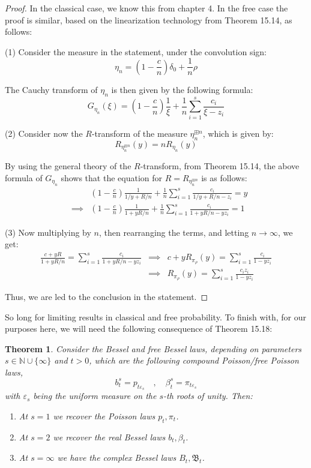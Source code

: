 \documentclass[12pt]{amsbook}
\newtheorem{theorem}{Theorem}[chapter]
\begin{document}
\begin{proof}
In the classical case, we know this from chapter 4. In the free case the proof is similar, based on the linearization technology from Theorem 15.14, as follows:

\medskip

(1) Consider the measure in the statement, under the convolution sign:
$$\eta_n=\left(1-\frac{c}{n}\right)\delta_0+\frac{1}{n}\rho$$

The Cauchy transform of $\eta_n$ is then given by the following formula:
$$G_{\eta_n}(\xi)=\left(1-\frac{c}{n}\right)\frac{1}{\xi}+\frac{1}{n}\sum_{i=1}^s\frac{c_i}{\xi-z_i}$$

(2) Consider now the $R$-transform of the measure $\eta_n^{\boxplus n}$, which is given by:
$$R_{\eta_n^{\boxplus n}}(y)=nR_{\eta_n}(y)$$

By using the general theory of the $R$-transform, from Theorem 15.14, the above formula of $G_{\eta_n}$ shows that the equation for $R=R_{\eta_n^{\boxplus n}}$ is as follows:
\begin{eqnarray*}
&&\left(1-\frac{c}{n}\right)\frac{1}{1/y+R/n}+\frac{1}{n}\sum_{i=1}^s\frac{c_i}{1/y+R/n-z_i}=y\\
&\implies&\left(1-\frac{c}{n}\right)\frac{1}{1+yR/n}+\frac{1}{n}\sum_{i=1}^s\frac{c_i}{1+yR/n-yz_i}=1
\end{eqnarray*}

(3) Now multiplying by $n$, then rearranging the terms, and letting $n\to\infty$, we get:
\begin{eqnarray*}
\frac{c+yR}{1+yR/n}=\sum_{i=1}^s\frac{c_i}{1+yR/n-yz_i}
&\implies&c+yR_{\pi_\rho}(y)=\sum_{i=1}^s\frac{c_i}{1-yz_i}\\
&\implies&R_{\pi_\rho}(y)=\sum_{i=1}^s\frac{c_iz_i}{1-yz_i}
\end{eqnarray*}

Thus, we are led to the conclusion in the statement.
\end{proof}

So long for limiting results in classical and free probability. To finish with, for our purposes here, we will need the following consequence of Theorem 15.18:


\begin{theorem}
Consider the Bessel and free Bessel laws, depending on parameters $s\in\mathbb N\cup\{\infty\}$ and $t>0$, which are the following compound Poisson/free Poisson laws,
$$b^s_t=p_{t\varepsilon_s}\quad,\quad 
\beta^s_t=\pi_{t\varepsilon_s}$$
with $\varepsilon_s$ being the uniform measure on the $s$-th roots of unity. Then:
\begin{enumerate}
\item At $s=1$ we recover the Poisson laws $p_t,\pi_t$.

\item At $s=2$ we recover the real Bessel laws $b_t,\beta_t$.

\item At $s=\infty$ we have the complex Bessel laws $B_t,\mathfrak B_t$.
\end{enumerate}
\end{theorem}
\end{document}
